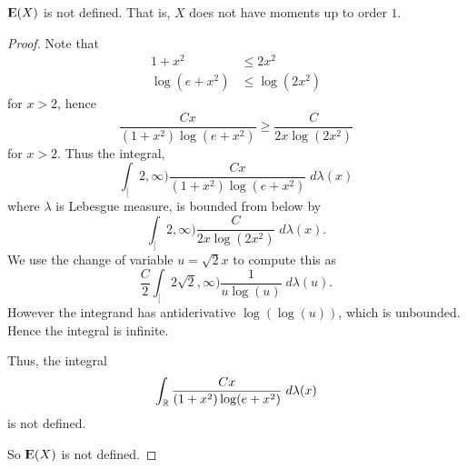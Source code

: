 \documentclass{unswmaths}
\begin{document}
\begin{lemma}
    ${\rm I\kern-.3em E}(X)$ is not defined. That is, $X$ does not have moments up
    to order $1$.
\end{lemma}
\begin{proof}
    Note that
    \begin{align*}
        1+x^2 &\leq 2x^2\\
        \log(e+x^2) &\leq \log(2x^2)
    \end{align*}
    for $x>2$, hence
    \begin{equation*}
        \frac{Cx}{(1+x^2)\log(e+x^2)} \geq \frac{C}{2x\log(2x^2)}
    \end{equation*}
    for $x > 2$. Thus the integral,
    \begin{equation*}
        \int_[2,\infty) \frac{Cx}{(1+x^2)\log(e+x^2)}\;d\lambda(x)
    \end{equation*}
    where $\lambda$ is Lebesgue measure, is bounded from below by
    \begin{equation*}
        \int_[2,\infty) \frac{C}{2x\log(2x^2)}\;d\lambda(x).
    \end{equation*}
    We use the change of variable $u = \sqrt{2}x$ to compute this as
    \begin{equation*}
        \frac{C}{2}\int_[2\sqrt{2},\infty) \frac{1}{u\log(u)}\;d\lambda(u).
    \end{equation*} 
    However the integrand has antiderivative $\log(\log(u))$, which is unbounded.
    Hence the integral is infinite.
    
    Thus, the integral
    \begin{equation*}
        \int_{\mathbb{R}} \frac{Cx}{(1+x^2)\log(e+x^2)}\;d\lambda(x)
    \end{equation*}
    is not defined.
    
    So ${\rm I\kern-.3em E}(X)$ is not defined.
\end{proof}
    
\end{document}

